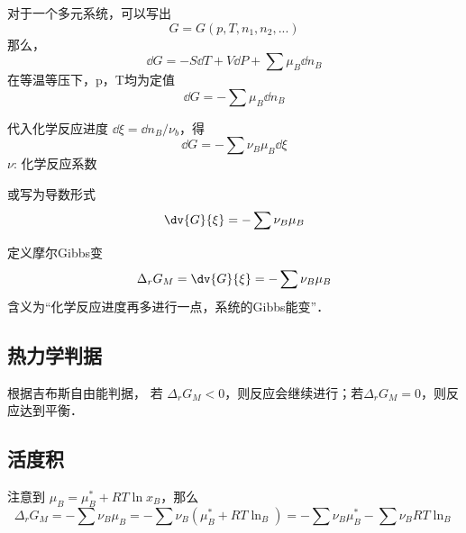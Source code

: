 
\begin{issues}
\issueDraft
\end{issues}


对于一个多元系统，可以写出
\begin{equation}
G=G(p,T,n_1,n_2,...)
\end{equation}
那么，
\begin{equation}
\dd G=-S \dd T +V \dd P + \sum \mu_B \dd n_B
\end{equation}
在等温等压下，p，T均为定值
\begin{equation}
\dd G=-\sum \mu_B \dd n_B
\end{equation}

代入化学反应进度 $\dd \xi=\dd n_B/\nu_b$，得
\begin{equation}
\dd G=-\sum \nu_B \mu_B \dd \xi
\end{equation}
$\nu$: 化学反应系数

或写为导数形式
\begin{equation}
\dv{G}{\xi}=-\sum \nu_B \mu_B
\end{equation}

定义摩尔Gibbs变
\begin{equation}
\Delta _r G_M = \dv{G}{\xi}=-\sum \nu_B \mu_B
\end{equation}
含义为“化学反应进度再多进行一点，系统的Gibbs能变”．

\subsection{热力学判据}
根据吉布斯自由能判据，
若 $\Delta _r G_M<0$，则反应会继续进行；若$\Delta _r G_M = 0$，则反应达到平衡．

\subsection{活度积}
注意到 
$\mu_B=\mu_B^*+RT \ln x_B$，那么
\begin{equation}
\Delta _r G_M =-\sum \nu_B \mu_B = -\sum \nu_B (\mu_B^*+RT\ln _B)=-\sum \nu_B \mu_B^* -\sum \nu_B RT \ln _B
\end{equation}
